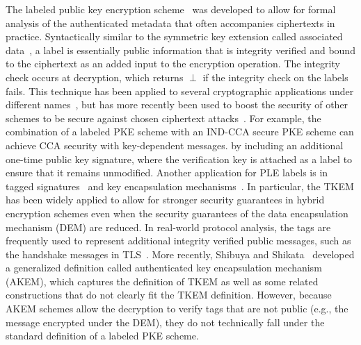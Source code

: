 The labeled public key encryption scheme~\cite{Shoup2001} was developed to allow for formal analysis of the authenticated metadata that often accompanies ciphertexts in practice.
Syntactically similar to the symmetric key extension called associated data~\cite{Rog02}, a label is essentially public information that is integrity
verified and bound to the ciphertext as an added input to the encryption operation.  The integrity check occurs at decryption, which returns $\perp$ if
the integrity check on the labels fails.  This technique has been applied to several cryptographic applications under different names~\cite{Lim1993,Camenisch2003}, but has more
recently been used to boost the security of other schemes to be secure against chosen ciphertext attacks~\cite{Shoup2002,Camenisch2009,Hofheinz2013,Libert2014}.  
For example, the combination of a labeled PKE scheme with an IND-CCA secure PKE scheme can achieve CCA security with key-dependent messages.  
by including an additional one-time public key signature, where the verification key is attached as a label to ensure that it remains unmodified.  Another application for PLE labels is
in tagged signatures~\cite{Abe2013} and key encapsulation mechanisms~\cite{AGK08}.  In particular, the TKEM has been widely applied to allow for stronger security guarantees
in hybrid encryption schemes even when the security guarantees of the data encapsulation mechanism (DEM) are reduced.  In real-world protocol analysis, the
tags are frequently used to represent additional integrity verified public messages, such as the handshake messages in TLS~\cite{Jonsson2002}.  
More recently, Shibuya and Shikata~\cite{Shibuya2011}
developed a generalized definition called authenticated key encapsulation mechanism (AKEM), which captures the definition of TKEM as well as some related
constructions that do not clearly fit the TKEM definition.  However, because AKEM schemes allow the decryption to verify tags that are not public (e.g., the message
encrypted under the DEM), they do not technically fall under the standard definition of a labeled PKE scheme.